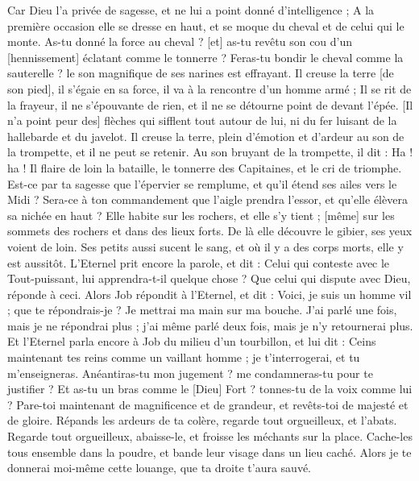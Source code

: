 \begin{multicols}{2}
Car Dieu l'a privée de sagesse, et ne lui a point donné d'intelligence ;
A la première occasion elle se dresse en haut, et se moque du cheval et de celui qui le monte.
As-tu donné la force au cheval ? [et] as-tu revêtu son cou d'un [hennissement] éclatant comme le tonnerre ?
Feras-tu bondir le cheval comme la sauterelle ? le son magnifique de ses narines est effrayant.
Il creuse la terre [de son pied], il s'égaie en sa force, il va à la rencontre d'un homme armé ;
Il se rit de la frayeur, il ne s'épouvante de rien, et il ne se détourne point de devant l'épée.
[Il n'a point peur des] flèches qui sifflent tout autour de lui, ni du fer luisant de la hallebarde et du javelot.
Il creuse la terre, plein d'émotion et d'ardeur au son de la trompette, et il ne peut se retenir.
Au son bruyant de la trompette, il dit : Ha ! ha ! Il flaire de loin la bataille, le tonnerre des Capitaines, et le cri de triomphe.
Est-ce par ta sagesse que l'épervier se remplume, et qu'il étend ses ailes vers le Midi ?
Sera-ce à ton commandement que l'aigle prendra l'essor, et qu'elle élèvera sa nichée en haut ?
Elle habite sur les rochers, et elle s'y tient ; [même] sur les sommets des rochers et dans des lieux forts.
De là elle découvre le gibier, ses yeux voient de loin.
Ses petits aussi sucent le sang, et où il y a des corps morts, elle y est aussitôt.
L'Eternel prit encore la parole, et dit :
Celui qui conteste avec le Tout-puissant, lui apprendra-t-il quelque chose ? Que celui qui dispute avec Dieu, réponde à ceci.
Alors Job répondit à l'Eternel, et dit :
Voici, je suis un homme vil ; que te répondrais-je ? Je mettrai ma main sur ma bouche.
J'ai parlé une fois, mais je ne répondrai plus ; j'ai même parlé deux fois, mais je n'y retournerai plus.
\VerseOne{}Et l'Eternel parla encore à Job du milieu d'un tourbillon, et lui dit :
Ceins maintenant tes reins comme un vaillant homme ; je t'interrogerai, et tu m'enseigneras.
Anéantiras-tu mon jugement ? me condamneras-tu pour te justifier ?
Et as-tu un bras comme le [Dieu] Fort ? tonnes-tu de la voix comme lui ?
Pare-toi maintenant de magnificence et de grandeur, et revêts-toi de majesté et de gloire.
Répands les ardeurs de ta colère, regarde tout orgueilleux, et l'abats.
Regarde tout orgueilleux, abaisse-le, et froisse les méchants sur la place.
Cache-les tous ensemble dans la poudre, et bande leur visage dans un lieu caché.
Alors je te donnerai moi-même cette louange, que ta droite t'aura sauvé.

\end{multicols}
